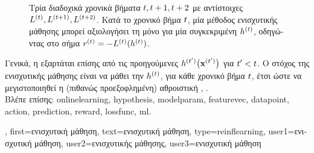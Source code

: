 {{\begin{figure}[H]
\begin{center}
		{
		\caption{\foreignlanguage{greek}{Τρία διαδοχικά χρονικά βήματα $t,t+1,t+2$ με 
			αντίστοιχες}  $L^{(t)}, L^{(t+1)}, L^{(t+2)}$. 
			\foreignlanguage{greek}{Κατά το χρονικό βήμα $t$, μία μέθοδος ενισχυτικής μάθησης μπορεί 
			αξιολογήσει τη}  \foreignlanguage{greek}{μόνο για μία συγκεκριμένη}  
			$h^{(t)}$, \foreignlanguage{greek}{οδηγώντας στο σήμα}  
			$r^{(t)}=-L^{(t)}(h^{(t)})$. \label{fig_reinforcementlearning_dict}} }
		\end{center}
		\end{figure}
		\foreignlanguage{greek}{Γενικά, η}  \foreignlanguage{greek}{εξαρτάται επίσης από τις 
		προηγούμενες}  $h^{(t')}\big({\bf x}^{(t')}\big)$ 
		\foreignlanguage{greek}{για $t' < t$. Ο στόχος της ενισχυτικής μάθησης είναι να μάθει την
		$h^{(t)}$, για κάθε χρονικό βήμα $t$, έτσι ώστε να μεγιστοποιηθεί η (πιθανώς 
		προεξοφλημένη) αθροιστική}  \cite{MLBasics}, \cite{SuttonEd2}.
		\\
		\foreignlanguage{greek}{Βλέπε επίσης:} \gls{onlinelearning}, \gls{hypothesis}, \gls{modelparam}, 
		\gls{featurevec}, \gls{datapoint}, \gls{action}, \gls{prediction}, \gls{reward}, \gls{lossfunc}, \gls{ml}.},
	first={\foreignlanguage{greek}{ενισχυτική μάθηση}},
	text={\foreignlanguage{greek}{ενισχυτική μάθηση}},
	type=reinflearning,
	user1={\foreignlanguage{greek}{ενισχυτική μάθηση}}, %
  	user2={\foreignlanguage{greek}{ενισχυτικής μάθησης}}, %
	user3={\foreignlanguage{greek}{ενισχυτική μάθηση}} %
}

